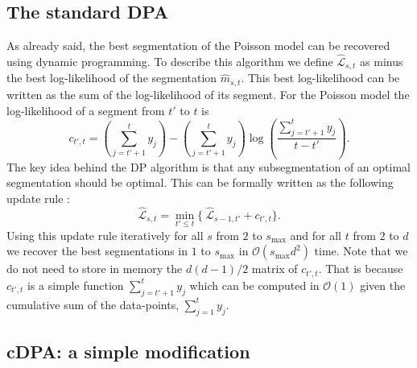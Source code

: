 \documentclass{article}
\begin{document}
\subsection{The standard DPA}

As already said, the best segmentation of the Poisson model can be
recovered using dynamic programming. To describe this algorithm we
define $\hat{\mathcal{L}}_{s,t}$ as minus the best log-likelihood of
the segmentation $\hat{m}_{s,t}$.  This best log-likelihood can be
written as the sum of the log-likelihood of its segment.  For the
Poisson model the log-likelihood of a segment from $t'$ to $t$ is
\begin{equation}
  \label{eq:log-lik-segment}
  c_{t',t} = (\sum_{j=t'+1}^t y_j) - (\sum_{j=t'+1}^t y_j)
\log(\frac{\sum_{j=t'+1}^t y_j}{t-t'}).
\end{equation}
The key idea behind the DP algorithm is that any subsegmentation
of an optimal segmentation should be optimal. 
This can be formally written as the following update rule :
\begin{equation}
\widehat{\mathcal{L}}_{s,t}= \min_{t' \leq t} \{ \ \widehat{\mathcal{L}}_{s-1,t'} + c_{t',t} \}. \label{eq:update1}
\end{equation}
Using this update rule iteratively for all $s$ from $2$ to
$s_{\text{max}}$ and for all $t$ from $2$ to $d$ we recover the best
segmentations in $1$ to $s_{\text{max}}$ in
$\mathcal{O}(s_{\text{max}}d^2)$ time.  Note that we do not need to
store in memory the $d(d-1)/2$ matrix of $c_{t',t}$.  That is because
$c_{t',t}$ is a simple function $\sum_{j=t'+1}^t y_j$ which can be
computed in $\mathcal{O}(1)$ given the cumulative sum of the
data-points, $\sum_{j=1}^t y_j$.


\subsection{cDPA: a simple modification}
 \label{sec:constrained-dp}
\end{document}
